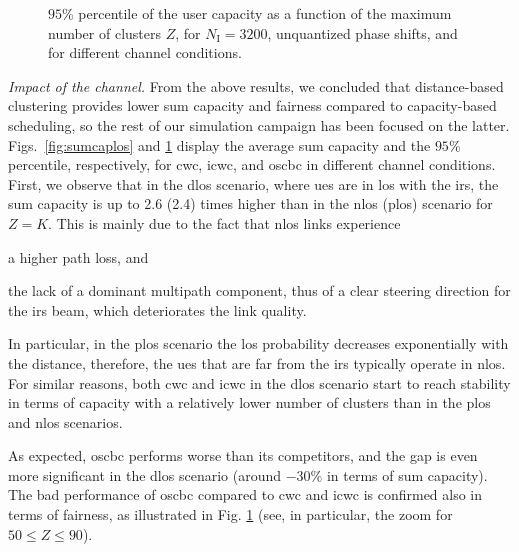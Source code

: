\begin{figure}[t]
    \centering
       \setlength{}
    \setlength{}
    
    \caption{$95$\% percentile of the user capacity as a function of the maximum number of clusters $Z$, for $N_{\mathrm I}=3200$, unquantized phase shifts, and for different channel conditions.} %
    \label{fig:quantitelos}
\end{figure}

\emph{Impact of the channel.}
From the above results, we concluded that distance-based clustering provides lower sum capacity and fairness compared to capacity-based scheduling, so the rest of our simulation campaign has been focused on the latter. 
Figs.~\ref{fig:sumcaplos} and \ref{fig:quantitelos} display the average sum capacity and the $95$\% percentile, respectively, for \gls{cwc}, \gls{icwc}, and \gls{oscbc} in different channel conditions.
First, we observe that in the \gls{dlos} scenario, where \glspl{ue} are in \gls{los} with the \gls{irs}, the sum capacity is up to 2.6 (2.4) times higher than in the \gls{nlos} (\gls{plos}) scenario for $Z=K$.
This is mainly due to the fact that \gls{nlos} links experience
\begin{enumerate*}[label=(\textit{\roman*})]
  \item a higher path loss, and
  \item the lack of a dominant multipath component, thus of a clear steering direction for the \gls{irs} beam, which deteriorates the link quality. \end{enumerate*} 
In particular, in the \gls{plos} scenario the \gls{los} probability decreases exponentially with the distance, therefore, the \glspl{ue} that are far from the \gls{irs} typically operate in \gls{nlos}.
For similar reasons, both \gls{cwc} and \gls{icwc} in the \gls{dlos} scenario start to reach stability in terms of capacity with a relatively lower number of clusters than in the \gls{plos} and \gls{nlos} scenarios. 

As expected, \gls{oscbc} performs worse than its competitors, and the gap is even more significant in the \gls{dlos} scenario (around $-30\%$ in terms of sum capacity).
The bad performance of \gls{oscbc} compared to \gls{cwc} and \gls{icwc} is confirmed also in terms of fairness, as illustrated in Fig. \ref{fig:quantitelos} (see, in particular, the zoom for $50\leq Z \leq 90$).

